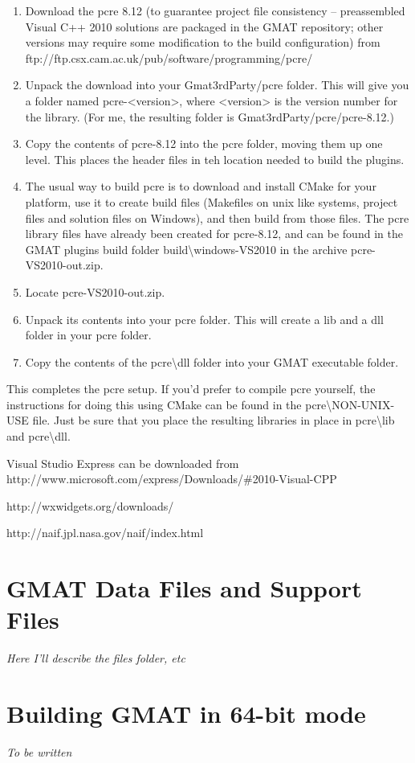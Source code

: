 \documentclass[letterpaper,10pt]{article}%
\begin{document}
\begin{enumerate}
\item Download the pcre 8.12 (to guarantee project file consistency -- preassembled Visual C++ 2010 solutions are packaged in the GMAT repository; other versions may require some modification to the build configuration) from ftp://ftp.csx.cam.ac.uk/pub/software/programming/pcre/
\item Unpack the download into your Gmat3rdParty/pcre folder.  This will give you a folder named pcre-<version>, where <version> is the version number for the library.  (For me, the resulting folder is Gmat3rdParty/pcre/pcre-8.12.)
\item Copy the contents of pcre-8.12 into the pcre folder, moving them up one level.  This places the header files in teh location needed to build the plugins.
\item The usual way to build pcre is to download and install CMake for your platform, use it to create build files (Makefiles on unix like systems, project files and solution files on Windows), and then build from those files. The pcre library files have already been created for pcre-8.12, and can be found in the GMAT plugins build folder build\textbackslash windows-VS2010 in the archive pcre-VS2010-out.zip.
\item Locate pcre-VS2010-out.zip.
\item Unpack its contents into your pcre folder.  This will create a lib and a dll folder in your pcre folder.
\item Copy the contents of the pcre\textbackslash dll folder into your GMAT executable folder.
\end{enumerate}

This completes the pcre setup.  If you'd prefer to compile pcre yourself, the instructions for doing this using CMake can be found in the pcre\textbackslash NON-UNIX-USE file.  Just be sure that you place the resulting libraries in place in pcre\textbackslash lib and pcre\textbackslash dll.

\begin{thebibliography}{9}                                                                                               
 Visual Studio Express can be downloaded from http://www.microsoft.com/express/Downloads/\#2010-Visual-CPP

 http://wxwidgets.org/downloads/

 http://naif.jpl.nasa.gov/naif/index.html

\end{thebibliography}


\appendix

\section{GMAT Data Files and Support Files }

\textit{Here I'll describe the files folder, etc}

\section{\label{app:64bit}Building GMAT in 64-bit mode}

\textit{To be written}
\end{document}
